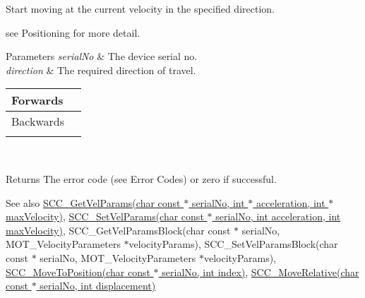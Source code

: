 Start moving at the current velocity in the specified direction. 

see Positioning for more detail.


\begin{DoxyParams}{Parameters}
{\em serial\+No} & The device serial no. \\
\hline
{\em direction} & The required direction of travel. \begin{tabularx}{\linewidth}{|*{2}{>{\raggedright\arraybackslash}X|}}\hline
Forwards&1 \\\cline{1-2}
Backwards&2 \\\cline{1-2}
\end{tabularx}
\\
\hline
\end{DoxyParams}
\begin{DoxyReturn}{Returns}
The error code (see Error Codes) or zero if successful. 
\end{DoxyReturn}
\begin{DoxySeeAlso}{See also}
\hyperlink{group___t_cube_stepper_ga9187cd31e037a95b88fdb3a7ec98aaea}{S\+C\+C\+\_\+\+Get\+Vel\+Params(char const $\ast$ serial\+No, int $\ast$ acceleration, int $\ast$ max\+Velocity)}, \hyperlink{group___t_cube_stepper_ga70e74ee3c291a6d642e1eefdcc349e81}{S\+C\+C\+\_\+\+Set\+Vel\+Params(char const $\ast$ serial\+No, int acceleration, int max\+Velocity)}, S\+C\+C\+\_\+\+Get\+Vel\+Params\+Block(char const $\ast$ serial\+No, M\+O\+T\+\_\+\+Velocity\+Parameters  $\ast$velocity\+Params), S\+C\+C\+\_\+\+Set\+Vel\+Params\+Block(char const $\ast$ serial\+No, M\+O\+T\+\_\+\+Velocity\+Parameters $\ast$velocity\+Params), \hyperlink{group___t_cube_stepper_gac8fc2643105853428722149e0a2cde41}{S\+C\+C\+\_\+\+Move\+To\+Position(char const $\ast$ serial\+No, int index)}, \hyperlink{group___t_cube_stepper_ga6f39a807e0ff7ac677464457447eb549}{S\+C\+C\+\_\+\+Move\+Relative(char const $\ast$ serial\+No, int displacement)}


\end{DoxySeeAlso}

\begin{DoxyCodeInclude}
\end{DoxyCodeInclude}
